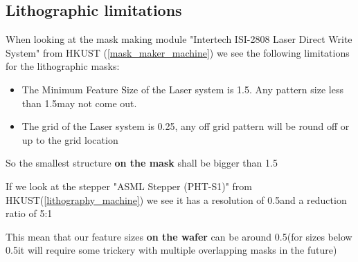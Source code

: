 \subsection{Lithographic limitations}\label{design_rules_lithographic}
When looking at the mask making module "Intertech ISI-2808 Laser Direct Write System" from HKUST (\autoref{mask_maker_machine}) we see the following limitations for the lithographic masks:
\begin{itemize}
	\item The Minimum Feature Size of the Laser system is 1.5\um. Any pattern size less than 1.5\um may not come out.
	\item The grid of the Laser system is 0.25\um, any off grid pattern will be round off or up to the grid location
\end{itemize}

So the smallest structure \textbf{on the mask} shall be bigger than 1.5\um

If we look at the stepper "ASML Stepper (PHT-S1)" from HKUST(\autoref{lithography_machine}) we see it has a resolution of 0.5\um and a reduction ratio of 5:1

This mean that our feature sizes \textbf{on the wafer} can be around 0.5\um (for sizes below 0.5\um it will require some trickery with multiple overlapping masks in the future)